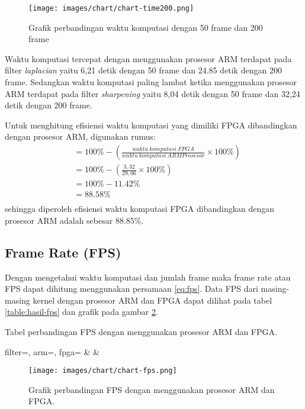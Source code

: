 \begin{figure}[ht]
    \centering
    \texttt{[image: images/chart/chart-time200.png]}
    \caption{Grafik perbandingan waktu komputasi dengan 50 frame dan 200 frame}
    \label{fig:chart-time200}
\end{figure}

Waktu komputasi tercepat dengan menggunakan prosesor ARM terdapat pada filter \textit{laplacian} yaitu 6,21 detik dengan 50 frame dan 24.85 detik dengan 200 frame. Sedangkan waktu komputasi paling lambat ketika menggunakan prosesor ARM terdapat pada filter \textit{sharpening} yaitu 8,04 detik dengan 50 frame dan 32,24 detik dengan 200 frame. 


Untuk menghitung efisiensi waktu komputasi yang dimiliki FPGA dibandingkan dengan prosesor ARM, digunakan rumus:
\begin{equation*}
    \begin{split}
& = 100\% - \left( \frac{waktu\ komputasi\ FPGA}{waktu\ komputasi\ ARM Prosesor} \times 100\% \right) \\
& = 100\% - \left( \frac{3,32}{29,06} \times 100\% \right) \\
& = 100\% - 11.42\% \\
& = 88.58\% \\
    \end{split}
\end{equation*}
sehingga diperoleh efisiensi waktu komputasi FPGA dibandingkan dengan prosesor ARM adalah sebesar 88.85\%.

\subsection{Frame Rate (FPS)}
Dengan mengetahui waktu komputasi dan jumlah frame maka frame rate atau FPS dapat dihitung menggunakan persamaan \ref{eq:fps}. Data FPS dari masing-masing kernel dengan prosesor ARM dan FPGA dapat dilihat pada tabel \ref{table:hasil-fps} dan grafik pada gambar \ref{fig:chart-fps}.
\begin{atable}
    \caption{Tabel perbandingan FPS dengan menggunakan prosesor ARM dan FPGA.}
    \label{table:hasil-fps}
        {
            filter=\filter, 
            arm=\arm, 
            fpga=\fpga}
        {
            \filter & 
            \arm & 
            \fpga }
\end{atable}
\begin{figure}[H]
    \texttt{[image: images/chart/chart-fps.png]}
    \caption{Grafik perbandingan FPS dengan menggunakan prosesor ARM dan FPGA.}
    \label{fig:chart-fps}
\end{figure}

